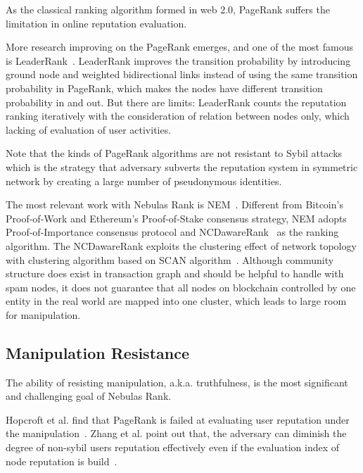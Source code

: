 As the classical ranking algorithm formed in web 2.0, PageRank suffers the limitation in online reputation evaluation.


More research improving on the PageRank emerges, and one of the most famous is LeaderRank~\cite{Li2014}. LeaderRank improves the transition probability by introducing ground node and weighted bidirectional links instead of using the same transition probability in PageRank, which makes the nodes have different transition probability in and out. But there are limits: LeaderRank counts the reputation ranking iteratively with the consideration of relation between nodes only, which lacking of evaluation of user activities. 


Note that the kinds of PageRank algorithms are not resistant to Sybil attacks~\cite{cheng2006manipulability} which is the strategy that adversary subverts the reputation system in symmetric network by creating a large number of pseudonymous identities.

The most relevant work with Nebulas Rank is NEM~\cite{nem}. Different from Bitcoin's Proof-of-Work and Ethereum's Proof-of-Stake consensus strategy, NEM adopts Proof-of-Importance consensus protocol and NCDawareRank~\cite{Nikolakopoulos2013} as the ranking algorithm. The NCDawareRank exploits the clustering effect of network topology with clustering algorithm based on SCAN algorithm~\cite{xu2007scan}\cite{shiokawa2015scan}\cite{chang2017mathsf}. Although community structure does exist in transaction graph and should be helpful to handle with spam nodes, it does not guarantee that all nodes on blockchain controlled by one entity in the real world are mapped into one cluster, which leads to large room for manipulation.


\subsection{Manipulation Resistance}
The ability of resisting manipulation, a.k.a. truthfulness, is the most significant and challenging goal of Nebulas Rank. 

Hopcroft et al. find that PageRank is failed at evaluating user reputation under the manipulation~\cite{hopcroft2007manipulation}. Zhang et al. point out that, the adversary can diminish the degree of non-sybil users reputation effectively even if the evaluation index of node reputation is build~\cite{zhang2016truetop}.

